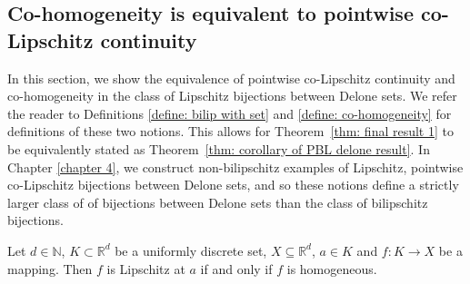 \documentclass{article}
\newcommand{\R}{\mathbb{R}}
\newcommand{\N}{\mathbb{N}}
\begin{document}
   \subsection{Co-homogeneity is equivalent to pointwise co-Lipschitz continuity}
In this section, we show the equivalence of pointwise co-Lipschitz continuity and co-homogeneity in the class of Lipschitz bijections between Delone sets. We refer the reader to Definitions \ref{define: bilip with set} and \ref{define: co-homogeneity} for definitions of these two notions. This allows for Theorem~\ref{thm: final result 1} to be equivalently stated as Theorem~\ref{thm: corollary of PBL delone result}. In Chapter \ref{chapter 4}, we construct non-bilipschitz examples of Lipschitz, pointwise co-Lipschitz bijections between Delone sets, and so these notions define a strictly larger class of of bijections between Delone sets than the class of bilipschitz bijections.
\begin{thm} \label{thm: co-hom equivalent to pointwise BL}
    Let $d \in \N$, $K \subset \R^d$ be a uniformly discrete set, $X \subseteq \R^d$, $a \in K$ and $f:K \to X$ be a mapping. Then $f$ is Lipschitz at $a$ if and only if $f$ is homogeneous.
\end{thm}
\end{document}
